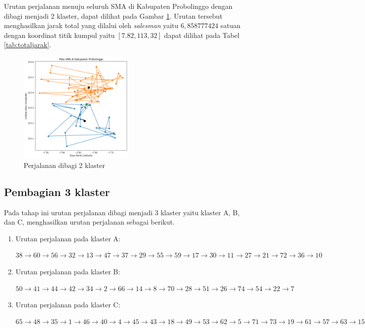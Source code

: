 Urutan perjalanan menuju seluruh SMA di Kabupaten Probolinggo dengan dibagi menjadi 2 klaster, dapat dilihat pada Gambar \ref{fig:hasil_mtsp2}. Urutan tersebut menghasilkan jarak total yang dilalui oleh \textit{salesman} yaitu $6,858777424$ satuan dengan koordinat titik kumpul yaitu $[7.82, 113,32]$ dapat dilihat pada Tabel \ref{tab:totaljarak}.


\begin{figure}[H]
\centering
\includegraphics[width=0.5\textwidth]{Gambar/hasil_mtsp/2}
\caption{Perjalanan dibagi 2 klaster}
\label{fig:hasil_mtsp2}
\end{figure}

\subsection{Pembagian 3 klaster}

Pada tahap ini urutan perjalanan dibagi menjadi 3 klaster yaitu klaster A, B, dan C, menghasilkan urutan perjalanan sebagai berikut.

\begin{enumerate}
\item Urutan perjalanan pada klaster A:

$38\rightarrow60\rightarrow56\rightarrow32\rightarrow13\rightarrow47\rightarrow37\rightarrow29\rightarrow55\rightarrow59\rightarrow17\rightarrow30\rightarrow11\rightarrow27\rightarrow21\rightarrow72\rightarrow36\rightarrow10$

\item Urutan perjalanan pada klaster B:

$50\rightarrow41\rightarrow44\rightarrow42\rightarrow34\rightarrow2\rightarrow66\rightarrow14\rightarrow8\rightarrow70\rightarrow28\rightarrow51\rightarrow26\rightarrow74\rightarrow54\rightarrow22\rightarrow7$

\item Urutan perjalanan pada klaster C:

$65\rightarrow48\rightarrow35\rightarrow1\rightarrow46\rightarrow40\rightarrow4\rightarrow45\rightarrow43\rightarrow18\rightarrow49\rightarrow53\rightarrow62\rightarrow5\rightarrow71\rightarrow73\rightarrow19\rightarrow61\rightarrow57\rightarrow63\rightarrow15\rightarrow25\rightarrow68\rightarrow58\rightarrow24\rightarrow31\rightarrow16\rightarrow3\rightarrow12\rightarrow20\rightarrow52\rightarrow67\rightarrow69\rightarrow75\rightarrow39\rightarrow6\rightarrow64\rightarrow23\rightarrow33\rightarrow9$

\end{enumerate}

